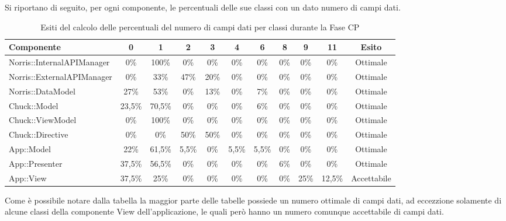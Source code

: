 
Si riportano di seguito, per ogni componente, le percentuali delle sue classi con un dato numero di campi dati.
\begin{table}[H]
	\centering
		\begin{tabu}{| l | c | c | c | c | c | c | c | c | c | c | }
			\hline
			Componente	& 0 & 1 & 2 & 3 & 4 & 6 & 8 & 9 & 11 & Esito		\\ \hline \hline
			Norris::InternalAPIManager	& 0\% & 100\% & 0\% & 0\% & 0\% & 0\% & 0\% & 0\% & 0\% & Ottimale  \\ \hline
			Norris::ExternalAPIManager  & 0\% & 33\% & 47\% & 20\% & 0\% & 0\% & 0\% & 0\% & 0\% & Ottimale  \\ \hline
			Norris::DataModel  & 27\% & 53\% & 0\% & 13\% & 0\% & 7\% & 0\% & 0\% & 0\% & Ottimale  \\ \hline
			Chuck::Model & 23,5\% & 70,5\% & 0\% & 0\% & 0\% & 6\% & 0\% & 0\% & 0\% & Ottimale  \\ \hline
			Chuck::ViewModel & 0\% & 100\% & 0\% & 0\% & 0\% & 0\% & 0\% & 0\% & 0\% & Ottimale  \\ \hline
			Chuck::Directive & 0\% & 0\% & 50\% & 50\% & 0\% & 0\% & 0\% & 0\% & 0\% & Ottimale  \\ \hline
			App::Model & 22\% & 61,5\% & 5,5\% & 0\% & 5,5\% & 5,5\% & 0\% & 0\% & 0\% & Ottimale  \\ \hline
			App::Presenter & 37,5\% & 56,5\% & 0\% & 0\% & 0\% & 0\% & 6\% & 0\% & 0\% & Ottimale  \\ \hline
			App::View & 37,5\% & 25\% & 0\% & 0\% & 0\% & 0\% & 0\% & 25\% & 12,5\% & Accettabile  \\ \hline
		\end{tabu}
	\caption{Esiti del calcolo delle percentuali del numero di campi dati per classi durante la Fase CP}
\end{table}
Come è possibile notare dalla tabella la maggior parte delle tabelle possiede un numero ottimale di campi dati, ad eccezzione solamente di alcune classi della componente View dell'applicazione, le quali però hanno un numero comunque accettabile di campi dati.
\\ \\


